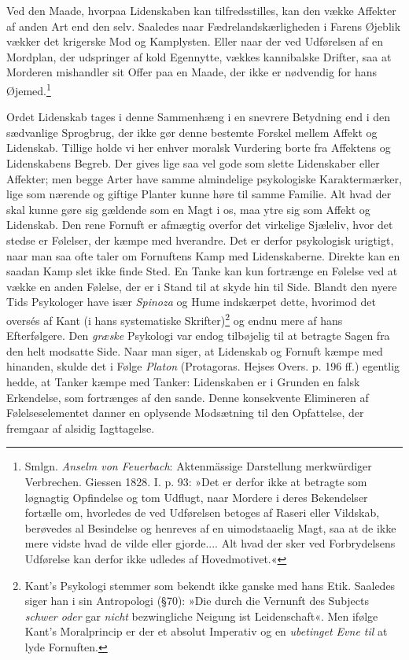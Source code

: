 \documentclass[12pt,a4paper,openany]{book}
\newcommand{\opage}[1]{\marginnote{\footnotesize\textit{[#1]}}}
\begin{document}
Ved den Maade, hvorpaa Lidenskaben kan tilfredsstilles, kan den vække
Affekter af anden Art end den selv. Saaledes naar Fædrelandskærligheden
i Farens Øjeblik vækker det
\opage{335}krigerske Mod og Kamplysten. Eller naar der ved Udførelsen af
en Mordplan, der udspringer af kold Egennytte, vækkes kannibalske
Drifter, saa at Morderen mishandler sit Offer paa en Maade, der ikke er
nødvendig for hans Øjemed.\footnote[1]{Smlgn. \emph{Anselm von
Feuerbach}: Aktenmässige Darstellung merkwürdiger Verbrechen. Giessen
1828. I. p. 93: »Det er derfor ikke at betragte som løgnagtig Opfindelse
og tom Udflugt, naar Mordere i deres Bekendelser fortælle om, hvorledes
de ved Udførelsen betoges af Raseri eller Vildskab, berøvedes al
Besindelse og henreves af en uimodstaaelig Magt, saa at de ikke mere
vidste hvad de vilde eller gjorde.... Alt hvad der sker ved
Forbrydelsens Udførelse kan derfor ikke udledes af Hovedmotivet.«}

Ordet Lidenskab tages i denne Sammenhæng i en snevrere Betydning end i
den sædvanlige Sprogbrug, der ikke gør denne bestemte Forskel mellem
Affekt og Lidenskab. Tillige holde vi her enhver moralsk Vurdering borte
fra Affektens og Lidenskabens Begreb. Der gives lige saa vel gode som
slette Lidenskaber eller Affekter; men begge Arter have samme
almindelige psykologiske Karaktermærker, lige som nærende og giftige
Planter kunne høre til samme Familie. Alt hvad der skal kunne gøre sig
gældende som en Magt i os, maa ytre sig som Affekt og Lidenskab. Den
rene Fornuft er afmægtig overfor det virkelige Sjæleliv, hvor det stedse
er Følelser, der kæmpe med hverandre. Det er derfor psykologisk
urigtigt, naar man saa ofte taler om Fornuftens Kamp med Lidenskaberne.
Direkte kan en saadan Kamp slet ikke finde Sted. En Tanke kan kun
fortrænge en Følelse ved at vække en anden Følelse, der er i Stand til
at skyde hin til Side. Blandt den nyere Tids Psykologer have især
\emph{Spinoza} og Hume indskærpet dette, hvorimod det oversés af Kant (i
hans systematiske Skrifter)\footnote[2]{Kant’s Psykologi stemmer som
bekendt ikke ganske med hans Etik. Saaledes siger han i sin Antropologi
(§70): »Die durch die Vernunft des Subjects \emph{schwer oder} gar
\emph{nicht} bezwingliche Neigung ist Leidenschaft«. Men ifølge Kant’s
Moralprincip er der et absolut Imperativ og en \emph{ubetinget Evne til}
at lyde Fornuften.} og endnu mere af hans Efterfølgere. Den
\emph{græske} Psykologi var endog tilbøjelig til at betragte Sagen fra
den helt modsatte Side. Naar man siger, at Lidenskab og Fornuft kæmpe
med hinanden, skulde det i
\opage{336}Følge \emph{Platon} (Protagoras. Hejses Overs. p. 196 ff.)
egentlig hedde, at Tanker kæmpe med Tanker: Lidenskaben er i Grunden en
falsk Erkendelse, som fortrænges af den sande. Denne konsekvente
Elimineren af Følelseselementet danner en oplysende Modsætning til den
Opfattelse, der fremgaar af alsidig Iagttagelse.
\end{document}
